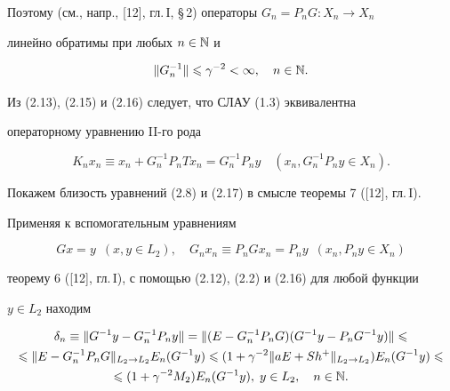 Поэтому (см., напр., [12], гл.\,I, \S\,2) операторы $G_n=P_nG:X_n\to X_n$


линейно обратимы при любых $n\in \Bbb N$ и


\begin{equation}


\|G_n^{-1}\|\lea \gamma^{-2}<\infty,\quad n\in \N.


\end{equation}





Из (2.13), (2.15) и (2.16) следует, что СЛАУ (1.3) эквивалентна


операторному уравнению II-го рода


\begin{equation}


K_nx_n\equiv x_n+G_n^{-1}P_n T x_n = G_n^{-1}P_n y \quad (x_n, G_n^{-1}P_n


y\in X_n).


\end{equation}





Покажем близость уравнений (2.8) и (2.17) в смысле теоремы 7 ([12], гл.\,I).


Применяя к вспомогательным уравнениям


\begin{equation}


Gx = y\ \; (x,y\in L_2),\quad G_nx_n \equiv P_nGx_n = P_ny\ \; (x_n, P_ny\in


X_n)


\end{equation}


теорему 6 ([12], гл.\,I), с помощью (2.12), (2.2) и (2.16) для любой функции


$y\in L_2$ находим


\begin{multline}


\delta_n\equiv \|G^{-1}y - G_n^{-1}P_ny\| = \|(E-G_n^{-1}P_nG)(G^{-1}y-


P_nG^{-1}y)\| \lea \\


\lea\|E-G^{-1}_nP_nG\|_{L_2\to L_2} E_n(G^{-1}y)\lea


(1+\gamma^{-2}\|aE+Sh^+\|_{L_2\to L_2})E_n(G^{-1}y)\lea \\


\lea(1+\gamma^{-2}M_2)E_n(G^{-1}y),\; y\in L_2,\quad n\in \N.


\end{multline}


